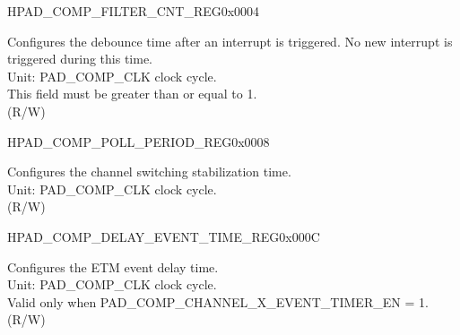\begin{register}{H}{PAD\_COMP\_FILTER\_CNT\_REG}{0x0004}\label{regdesc:PADCOMPFILTERCNTREG}
%
\regnewline%
\begin{regdesc}\begin{reglist}
\label{fielddesc:PADCOMPFILTERCNT}\item [PAD\_COMP\_FILTER\_CNT] Configures the debounce time after an interrupt is triggered. No new interrupt is triggered during this time.\\
Unit: PAD\_COMP\_CLK clock cycle.\\
This field must be greater than or equal to 1.\\
(R/W)
\end{reglist}\end{regdesc}
\end{register}


\begin{register}{H}{PAD\_COMP\_POLL\_PERIOD\_REG}{0x0008}\label{regdesc:PADCOMPPOLLPERIODREG}
%
%
\regnewline%
\begin{regdesc}\begin{reglist}
\label{fielddesc:PADCOMPPOLLPERIOD}\item [PAD\_COMP\_POLL\_PERIOD] Configures the channel switching stabilization time.\\
Unit: PAD\_COMP\_CLK clock cycle.\\
(R/W)
\end{reglist}\end{regdesc}
\end{register}


\begin{register}{H}{PAD\_COMP\_DELAY\_EVENT\_TIME\_REG}{0x000C}\label{regdesc:PADCOMPDELAYEVENTTIMEREG}
%
%
\regnewline%
\begin{regdesc}\begin{reglist}
\label{fielddesc:PADCOMPDELAYEVENTTIME}\item [PAD\_COMP\_DELAY\_EVENT\_TIME] Configures the ETM event delay time.\\
Unit: PAD\_COMP\_CLK clock cycle.\\
Valid only when PAD\_COMP\_CHANNEL\_X\_EVENT\_TIMER\_EN = 1.\\
(R/W)
\end{reglist}\end{regdesc}
\end{register}


